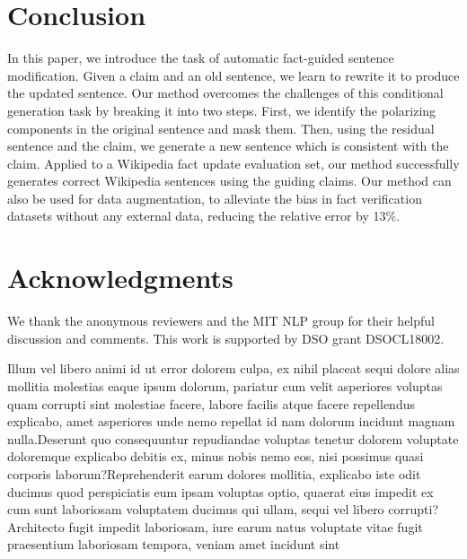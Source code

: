 \documentclass[letterpaper]{article} %
\begin{document}
\section{Conclusion}
\label{sec:discussion}
In this paper, we introduce the task of automatic fact-guided sentence modification. Given a claim and an old sentence, we learn to rewrite it to produce the updated sentence. Our method overcomes the challenges of this conditional generation task by breaking it into two steps. First, we identify the polarizing components in the original sentence and mask them. Then, using the residual sentence and the claim, we generate a new sentence which is consistent with the claim. Applied to a Wikipedia fact update evaluation set, our method successfully generates correct Wikipedia sentences using the guiding claims. Our method can also be used for data augmentation, to alleviate the bias in fact verification datasets without any external data, reducing the relative error by 13\%.
\section{Acknowledgments}
We thank the anonymous reviewers and the MIT NLP group for their helpful discussion and comments.
This work is supported by DSO grant DSOCL18002.

% 
Illum vel libero animi id ut error dolorem culpa, ex nihil placeat sequi dolore alias mollitia molestias eaque ipsum dolorum, pariatur cum velit asperiores voluptas quam corrupti sint molestiae facere, labore facilis atque facere repellendus explicabo, amet asperiores unde nemo repellat id nam dolorum incidunt magnam nulla.Deserunt quo consequuntur repudiandae voluptas tenetur dolorem voluptate doloremque explicabo debitis ex, minus nobis nemo eos, nisi possimus quasi corporis laborum?Reprehenderit earum dolores mollitia, explicabo iste odit ducimus quod perspiciatis eum ipsam voluptas optio, quaerat eius impedit ex cum sunt laboriosam voluptatem ducimus qui ullam, sequi vel libero corrupti?Architecto fugit impedit laboriosam, iure earum natus voluptate vitae fugit praesentium laboriosam tempora, veniam amet incidunt sint


\end{document}
